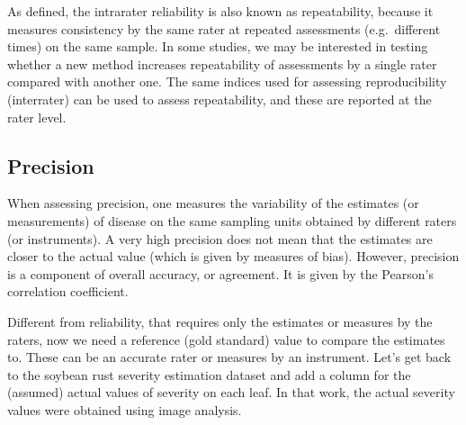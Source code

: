 \documentclass[
  letterpaper,
]{book}
\begin{document}
As defined, the intrarater reliability is also known as repeatability,
because it measures consistency by the same rater at repeated
assessments (e.g.~different times) on the same sample. In some studies,
we may be interested in testing whether a new method increases
repeatability of assessments by a single rater compared with another
one. The same indices used for assessing reproducibility (interrater)
can be used to assess repeatability, and these are reported at the rater
level.

\hypertarget{precision}{%
\subsection{Precision}\label{precision}}

When assessing precision, one measures the variability of the estimates
(or measurements) of disease on the same sampling units obtained by
different raters (or instruments). A very high precision does not mean
that the estimates are closer to the actual value (which is given by
measures of bias). However, precision is a component of overall
accuracy, or agreement. It is given by the Pearson's correlation
coefficient.

Different from reliability, that requires only the estimates or measures
by the raters, now we need a reference (gold standard) value to compare
the estimates to. These can be an accurate rater or measures by an
instrument. Let's get back to the soybean rust severity estimation
dataset and add a column for the (assumed) actual values of severity on
each leaf. In that work, the actual severity values were obtained using
image analysis.
\end{document}
